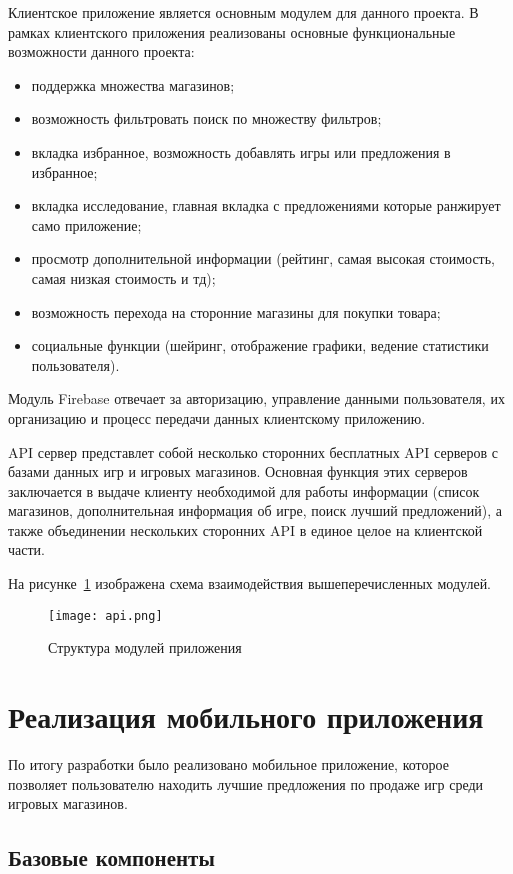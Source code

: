 Клиентское приложение является основным модулем для данного проекта. В рамках клиентского приложения реализованы основные функциональные возможности данного проекта:
\begin{itemize}
  \item поддержка множества магазинов;
  \item возможность фильтровать поиск по множеству фильтров;
  \item вкладка избранное, возможность добавлять игры или предложения в избранное;
  \item вкладка исследование, главная вкладка с предложениями которые ранжирует само приложение;
  \item просмотр дополнительной информации (рейтинг, самая высокая стоимость, самая низкая стоимость и тд);
  \item возможность перехода на сторонние магазины для покупки товара;
  \item социальные функции (шейринг, отображение графики, ведение статистики пользователя).
\end{itemize}
 
Модуль Firebase отвечает за авторизацию, управление данными пользователя, их организацию и процесс передачи данных клиентскому приложению.
 
API сервер представлет собой несколько сторонних бесплатных API серверов с базами данных игр и игровых магазинов. Основная функция этих серверов заключается в выдаче клиенту необходимой для работы информации (список магазинов, дополнительная информация об игре, поиск лучший предложений), а также объединении нескольких сторонних API в единое целое на клиентской части.
 
На рисунке~\ref{fig:arch:modules_scheme} изображена схема взаимодействия вышеперечисленных модулей.
 
\begin{figure}[H]
 \centering
   \texttt{[image: api.png]} 
   \caption{Структура модулей приложения}
   \label{fig:arch:modules_scheme}
\end{figure}
 
\section{Реализация мобильного приложения}
\label{sec:code}
По итогу разработки было реализовано мобильное приложение, которое позволяет пользователю находить лучшие предложения по продаже игр среди игровых магазинов.

\subsection{Базовые компоненты}

